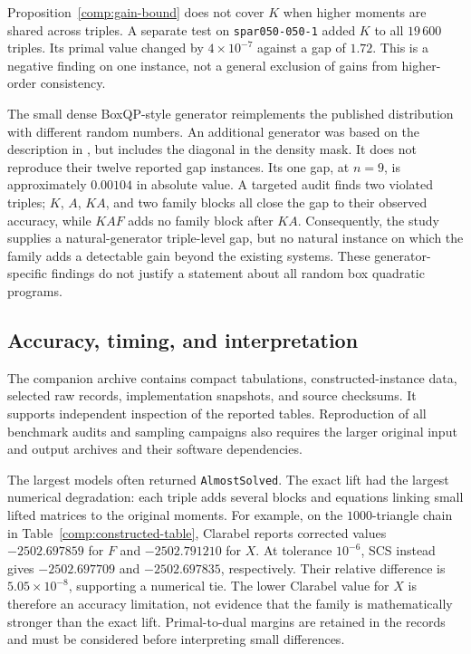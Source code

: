 Proposition~\ref{comp:gain-bound} does not cover $K$ when higher
moments are shared across triples. A separate test on
\texttt{spar050-050-1} added $K$ to all $19\,600$ triples.
Its primal value changed by $4\times10^{-7}$ against a gap of $1.72$.
This is a negative finding on one instance, not a general exclusion
of gains from higher-order consistency.

The small dense BoxQP-style generator reimplements the published
distribution with different random numbers. An additional generator
was based on the description in
\citet{AnstreicherPuges2025ETRI}, but includes the diagonal in the
density mask. It does not reproduce their twelve reported gap
instances. Its one gap, at $n=9$, is approximately $0.00104$ in
absolute value. A targeted audit finds two violated triples; $K$,
$A$, $KA$, and two family blocks all close the gap to their observed
accuracy, while $KAF$ adds no family block after $KA$.
Consequently, the study supplies a natural-generator triple-level gap,
but no natural instance on which the family adds a detectable gain
beyond the existing systems. These generator-specific findings do not
justify a statement about all random box quadratic programs.

\subsection{Accuracy, timing, and interpretation}
\label{comp:numerics}

The companion archive contains compact tabulations, constructed-instance
data, selected raw records, implementation snapshots, and source checksums.
It supports independent inspection of the reported tables. Reproduction
of all benchmark audits and sampling campaigns also requires the larger
original input and output archives and their software dependencies.

The largest models often returned \texttt{AlmostSolved}. The exact
lift had the largest numerical degradation: each triple adds several
blocks and equations linking small lifted matrices to the original
moments. For example, on the $1000$-triangle chain in
Table~\ref{comp:constructed-table}, Clarabel reports corrected values
$-2502.697859$ for $F$ and $-2502.791210$ for $X$.
At tolerance $10^{-6}$, SCS instead gives $-2502.697709$ and
$-2502.697835$, respectively. Their relative difference is
$5.05\times10^{-8}$, supporting a numerical tie. The lower
Clarabel value for $X$ is therefore an accuracy limitation, not
evidence that the family is mathematically stronger than the exact
lift. Primal-to-dual margins are retained in the records and must be
considered before interpreting small differences.


